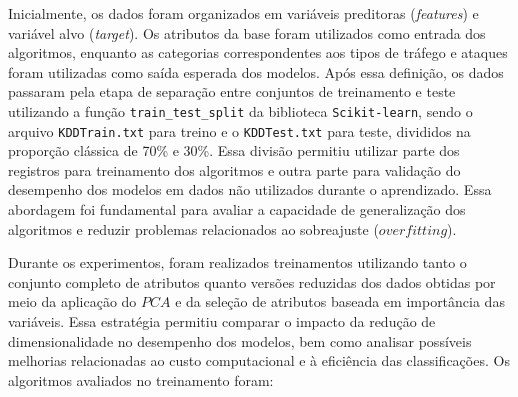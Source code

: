 \documentclass[a4paper,10pt, twocolumn]{article}
\begin{document}
Inicialmente, os dados foram organizados em variáveis preditoras (\textit{features}) e 
variável alvo (\textit{target}). Os atributos da base foram utilizados como entrada dos 
algoritmos, enquanto as categorias correspondentes aos tipos de tráfego e 
ataques foram utilizadas como saída esperada dos modelos. Após essa definição, 
os dados passaram pela etapa de separação entre conjuntos de treinamento e teste 
utilizando a função \texttt{train\_test\_split} da biblioteca \texttt{Scikit-learn}, sendo o arquivo 
\texttt{KDDTrain.txt} para treino e o \texttt{KDDTest.txt} para teste, divididos na proporção 
clássica de 70\% e 30\%.  Essa divisão permitiu utilizar parte dos registros 
para treinamento dos algoritmos e outra parte para validação do desempenho dos 
modelos em dados não utilizados durante o aprendizado. Essa abordagem foi 
fundamental para avaliar a capacidade de generalização dos algoritmos e reduzir 
problemas relacionados ao sobreajuste (\textit{$overfitting$}).

Durante os experimentos, foram realizados treinamentos utilizando tanto o 
conjunto completo de atributos quanto versões reduzidas dos dados obtidas por 
meio da aplicação do $PCA$ e da seleção de atributos baseada em importância das 
variáveis. Essa estratégia permitiu comparar o impacto da redução de 
dimensionalidade no desempenho dos modelos, bem como analisar possíveis 
melhorias relacionadas ao custo computacional e à eficiência das classificações. 
Os algoritmos avaliados no treinamento foram: 
\end{document}
